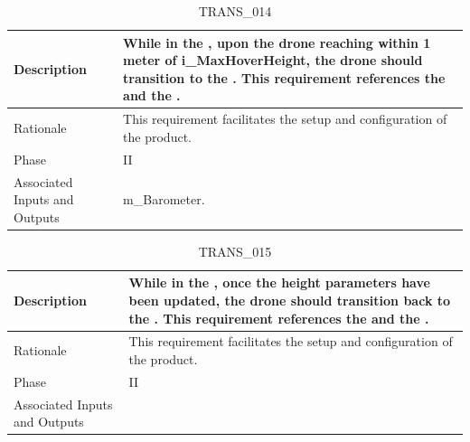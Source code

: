 \documentclass{article}
\begin{document}
\begin{table}[!h]
\begin{center}
\caption {TRANS\_014} 
\label{TRANS_014}
\begin{tabular}{ | m{3cm} | m{11cm} | }
\hline
Description & While in the \nameref{Takeoff State}, upon the drone reaching within 1 meter of i\_MaxHoverHeight, the drone should transition to the \nameref{Hover State}. This requirement references the \nameref{Hover State} and the \nameref{Takeoff State}. \\
\hline
Rationale & This requirement facilitates the setup and configuration of the product.  \\
\hline
Phase & II \\
\hline
Associated Inputs and Outputs & m\_Barometer. \\
\hline
\end{tabular}
\end{center}
\end{table}

\begin{table}[!h]
\begin{center}
\caption {TRANS\_015} 
\label{TRANS_015}
\begin{tabular}{ | m{3cm} | m{11cm} | }
\hline
Description & While in the \nameref{Configure State}, once the height parameters have been updated, the drone should transition back to the \nameref{Idle State}. This requirement references the \nameref{Configure State} and the \nameref{Idle State}. \\
\hline
Rationale & This requirement facilitates the setup and configuration of the product.  \\
\hline
Phase & II \\
\hline
Associated Inputs and Outputs & \\
\hline
\end{tabular}
\end{center}
\end{table}
\end{document}
